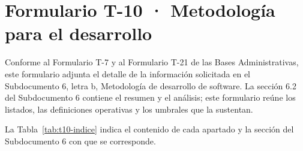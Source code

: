 \documentclass[11pt]{article}
\begin{document}
\tableofcontents
\clearpage

\renewcommand{\tablename}{Tabla}
\renewcommand{\thetable}{T-10.\arabic{table}}

\section{Formulario T-10 · Metodología para el desarrollo}\label{formulario-t-10}

Conforme al Formulario T-7 y al Formulario T-21 de las Bases Administrativas, este formulario adjunta el detalle de la información solicitada en el Subdocumento 6, letra b, Metodología de desarrollo de software. La sección 6.2 del Subdocumento 6 contiene el resumen y el análisis; este formulario reúne los listados, las definiciones operativas y los umbrales que la sustentan.

La Tabla~\mbox{\ref{tab:t10-indice}} indica el contenido de cada apartado y la sección del Subdocumento 6 con que se corresponde.
\end{document}
